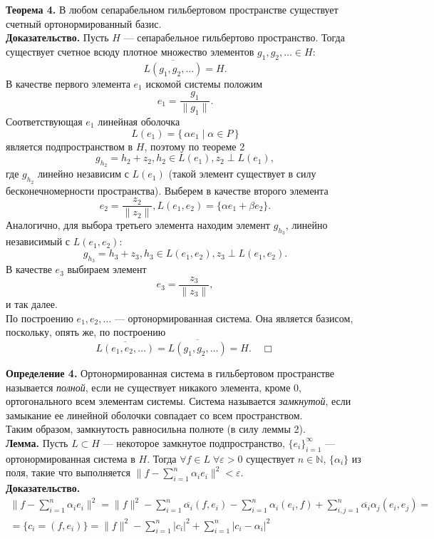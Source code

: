 \documentclass[12pt,a4paper, titlepage]{article}
\begin{document}
\textbf{Теорема 4.} В любом сепарабельном гильбертовом пространстве существует счетный ортонормированный базис.\\
\textbf{Доказательство.} Пусть $H$ --- сепарабельное гильбертово пространство. Тогда существует счетное всюду плотное множество элементов $g_1, g_2, \ldots \in H$:
$$
\overline{L(g_1, g_2, \ldots)} = H.
$$
В качестве первого элемента $e_1$ искомой системы положим 
$$
e_1 = \frac{g_1}{\|g_1\|}. 
$$
Соответствующая $e_1$ линейная оболочка
$$
L(e_1) = \{\, \alpha e_1 \mid \alpha \in P\,\}
$$
является подпространством в $H$, поэтому по теореме 2 
$$
g_{h_2} = h_2 + z_2, h_2 \in L(e_1), z_2 \perp L(e_1),
$$
где $g_{h_2}$ линейно независим с $L(e_1)$ (такой элемент существует в силу бесконечномерности пространства). Выберем в качестве второго элемента
$$
e_2 = \frac{z_2}{\|z_2\|}, L(e_1, e_2) = \{\alpha e_1 + \beta e_2\}.
$$
Аналогично, для выбора третьего элемента находим элемент $g_{h_3}$, линейно независимый с $L(e_1, e_2)$:
$$
g_{h_3} = h_3 + z_3, h_3 \in L(e_1, e_2), z_3 \perp L(e_1, e_2).
$$
В качестве $e_3$ выбираем элемент
$$
e_3 = \frac{z_3}{\|z_3\|},
$$
и так далее.\\

По построению ${e_1, e_2, \ldots }$ --- ортонормированная система. Она является базисом, поскольку, опять же, по построению
$$
\overline{L(e_1, e_2, \ldots )} = \overline{L(g_1, g_2, \ldots )} = H. \quad \Box
$$

\textbf{Определение 4.} Ортонормированная система в гильбертовом пространстве называется \textit{полной}, если не существует никакого элемента, кроме $0$, ортогонального всем элементам системы. Система называется \textit{замкнутой}, если замыкание ее линейной оболочки совпадает со всем пространством.\\

Таким образом, замкнутость равносильна полноте (в силу леммы 2).\\

\textbf{Лемма.} Пусть $L \subset H$ --- некоторое замкнутое подпространство, $\{e_i\}_{i=1}^\infty$ --- ортонормированная система в $H$. Тогда $\forall f \in L \; \forall \varepsilon > 0$ существует $n \in \mathbb{N}$, $\{\alpha_i\}$ из поля, такие что выполняется $\|f - \sum\limits_{i=1}^n\alpha_i e_i\|^2 < \varepsilon$. \\
\textbf{Доказательство.}
\begin{multline*}
\|f - \sum\limits_{i=1}^n\alpha_i e_i\|^2 = \|f\|^2  - \sum\limits_{i=1}^n\overline{\alpha_i} (f, e_i) - \sum\limits_{i=1}^n\alpha_i (e_i, f) + \sum\limits_{i,j=1}^n\overline{\alpha_i} \alpha_j (e_i, e_j) = \\
= \{c_i = (f, e_i)\}= \|f\|^2  - \sum\limits_{i=1}^n|c_i|^2 + \sum\limits_{i=1}^n|c_i - \alpha_i|^2
\end{multline*}
\end{document}
